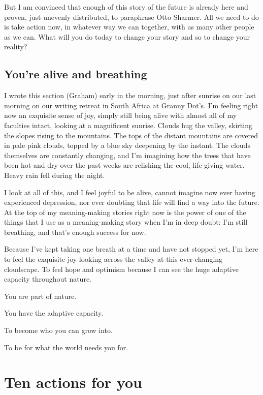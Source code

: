 But I am convinced that enough of this story of the future is already here and proven, just unevenly distributed, to paraphrase Otto Sharmer.  All we need to do is take action now, in whatever way we can together, with as many other people as we can. What will you do today to change your story and so to change your reality?




\section{You're alive and breathing}
I wrote this section (Graham) early in the morning, just after sunrise on our last morning on our writing retreat in South Africa at Granny Dot’s. I'm feeling right now an exquisite sense of joy, simply still being alive with almost all of my faculties intact, looking at a magnificent sunrise. Clouds hug the valley, skirting the slopes rising to the mountains. The tops of the distant mountains are covered in pale pink clouds, topped by a blue sky deepening by the instant. The clouds themselves are constantly changing, and I'm imagining how the trees that have been hot and dry over the past weeks are relishing the cool, life-giving water. Heavy rain fell during the night.


I look at all of this, and I feel joyful to be alive, cannot imagine now ever having experienced depression, nor ever doubting that life will find a way into the future. At the top of my meaning-making stories right now is the power of one of the things that I use as a meaning-making story when I'm in deep doubt: I'm still breathing, and that's enough success for now.


Because I've kept taking one breath at a time and have not stopped yet, I'm here to feel the exquisite joy looking across the valley at this ever-changing cloudscape. To feel hope and optimism because I can see the huge adaptive capacity throughout nature. 


\smallskip


You are part of nature. 


You have the adaptive capacity.


To become who you can grow into.


To be for what the world needs you for.






\chapter{Ten actions for you}


